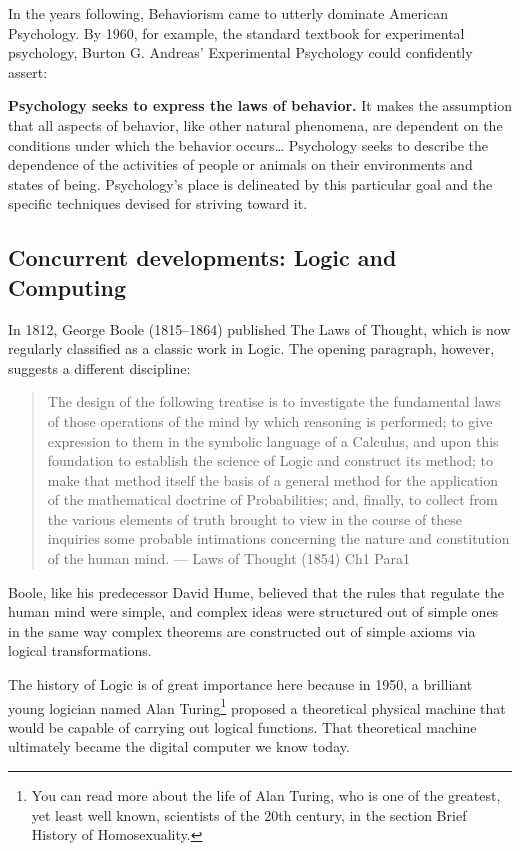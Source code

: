 \begin{refsection}
In the years following, Behaviorism came to utterly dominate American Psychology. By 1960, for example, the standard textbook for experimental psychology, Burton G. Andreas' Experimental Psychology could confidently assert:

\textbf{Psychology seeks to express the laws of behavior.} It makes the assumption that all aspects of behavior, like other natural phenomena, are dependent on the conditions under which the behavior occurs{\ldots} Psychology seeks to describe the dependence of the activities of people or animals on their environments and states of being. Psychology's place is delineated by this particular goal and the specific techniques devised for striving toward it. ~\citep[p. 4]{Andreas:WVE4neKa}

\subsection{Concurrent developments: Logic and Computing}
\label{concurrentdevelopments:logicandcomputing}

In 1812, George Boole (1815--1864) published The Laws of Thought, which is now regularly classified as a classic work in Logic. The opening paragraph, however, suggests a different discipline:

\begin{quote}

The design of the following treatise is to investigate the fundamental laws of those operations of the mind by which reasoning is performed; to give expression to them in the symbolic language of a Calculus, and upon this foundation to establish the science of Logic and construct its method; to make that method itself the basis of a general method for the application of the mathematical doctrine of Probabilities; and, finally, to collect from the various elements of truth brought to view in the course of these inquiries some probable intimations concerning the nature and constitution of the human mind. --- Laws of Thought (1854) Ch1 Para1
\end{quote}

Boole, like his predecessor David Hume, believed that the rules that regulate the human mind were simple, and complex ideas were structured out of simple ones in the same way complex theorems are constructed out of simple axioms via logical transformations.

The history of Logic is of great importance here because in 1950, a brilliant young logician named Alan Turing\footnote{You can read more about the life of Alan Turing, who is one of the greatest, yet least well known, scientists of the 20th century, in the section Brief History of Homosexuality.} proposed a theoretical physical machine that would be capable of carrying out logical functions. That theoretical machine ultimately became the digital computer we know today.


\end{refsection}
